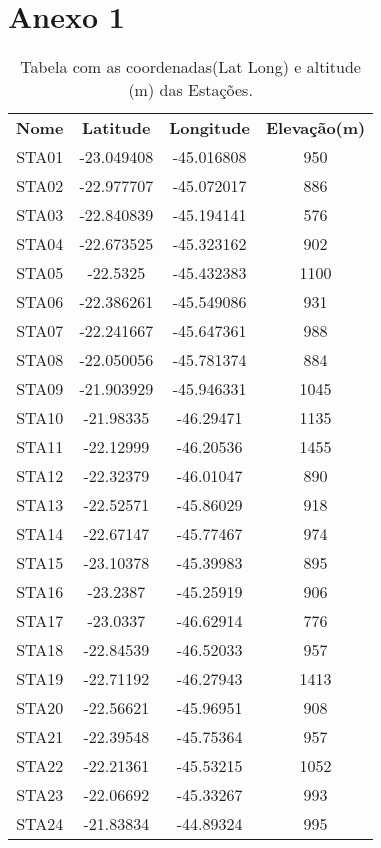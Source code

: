 \chapter*{Anexo 1}	


\begin{center}
\begin{table}[!ht]
\caption{Tabela com as coordenadas(Lat Long) e altitude (m) das Estações.}
\begin{center}
\begin{tabular}{| c | c | c | c |}
{\large \textbf{Nome}} &	{\large \textbf{Latitude}} & {\large \textbf{Longitude}} & {\large \textbf{Elevação(m)}}\\
STA01 & -23.049408 & -45.016808 & 950\\
STA02 & -22.977707 & -45.072017 & 886\\
STA03 & -22.840839 & -45.194141 & 576\\
STA04 & -22.673525 & -45.323162 & 902\\
STA05 & -22.5325 & -45.432383 & 1100\\
STA06 & -22.386261 & -45.549086 & 931\\
STA07 & -22.241667 & -45.647361 & 988\\
STA08 & -22.050056 & -45.781374 & 884\\
STA09 & -21.903929 & -45.946331 & 1045\\
STA10 & -21.98335 & -46.29471 & 1135\\
STA11 & -22.12999 & -46.20536 & 1455\\
STA12 & -22.32379 & -46.01047 & 890\\
STA13 & -22.52571 & -45.86029 & 918\\
STA14 & -22.67147 & -45.77467 & 974\\
STA15 & -23.10378 & -45.39983 & 895\\
STA16 & -23.2387 & -45.25919 & 906\\
STA17 & -23.0337 & -46.62914 & 776\\
STA18 & -22.84539 & -46.52033 & 957\\
STA19 & -22.71192 & -46.27943 & 1413\\
STA20 & -22.56621 & -45.96951 & 908\\
STA21 & -22.39548 & -45.75364 & 957\\
STA22 & -22.21361 & -45.53215 & 1052\\
STA23 & -22.06692 & -45.33267 & 993\\
STA24 & -21.83834 & -44.89324 & 995\\
\hline
\end{tabular}
\label{tabela1}
\end{center}
\end{table}
\end{center}

